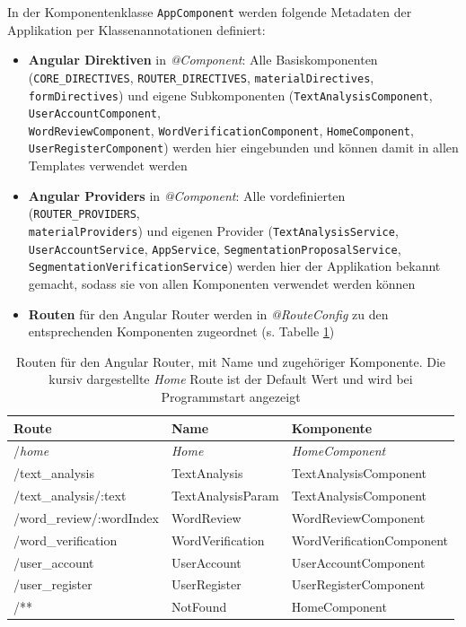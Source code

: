 In der Komponentenklasse \texttt{AppComponent} werden folgende Metadaten der Applikation per Klassenannotationen definiert:
\begin{itemize}
	\item \textbf{Angular Direktiven} in \textit{@Component}: Alle Basiskomponenten (\texttt{CORE\_DIRECTIVES}, \texttt{ROUTER\_DIRECTIVES}, \texttt{materialDirectives},
	\texttt{formDirectives}) und eigene Subkomponenten (\texttt{TextAnalysisComponent}, \texttt{UserAccountComponent},\\
	\texttt{WordReviewComponent}, \texttt{WordVerificationComponent}, \texttt{HomeComponent},\\
	\texttt{UserRegisterComponent}) werden hier eingebunden und können damit in allen Templates verwendet werden 
	
	\item \textbf{Angular Providers} in \textit{@Component}: Alle vordefinierten (\texttt{ROUTER\_PROVIDERS},\\ \texttt{materialProviders}) und eigenen Provider (\texttt{TextAnalysisService},\\
	\texttt{UserAccountService}, \texttt{AppService}, \texttt{SegmentationProposalService},\\ \texttt{SegmentationVerificationService}) werden hier der Applikation bekannt gemacht, sodass sie von allen Komponenten verwendet werden können
	
	\item \textbf{Routen} für den Angular Router werden in \textit{@RouteConfig} zu den entsprechenden Komponenten zugeordnet (s. Tabelle \ref{table:routeconfig})
\end{itemize}

\begin{table}
	\centering
	\begin{tabular}{|l|l|l|}
		\hline
		\textbf{Route} & \textbf{Name} & \textbf{Komponente}\\
		\hline
		\hline
		/\textit{home} & \textit{Home} & \textit{HomeComponent} \\
		\hline
		/text\_analysis & TextAnalysis & TextAnalysisComponent \\
		\hline
		/text\_analysis/:text & TextAnalysisParam & TextAnalysisComponent \\
		\hline
		/word\_review/:wordIndex & WordReview & WordReviewComponent \\
		\hline
		/word\_verification & WordVerification & WordVerificationComponent \\
		\hline
		/user\_account & UserAccount & UserAccountComponent \\
		\hline
		/user\_register & UserRegister & UserRegisterComponent \\
		\hline
		/** & NotFound & HomeComponent \\
		\hline
	\end{tabular}
	\caption{Routen für den Angular Router, mit Name und zugehöriger Komponente. Die kursiv dargestellte \textit{Home} Route ist der Default Wert und wird bei Programmstart angezeigt}
	\label{table:routeconfig}
\end{table}

